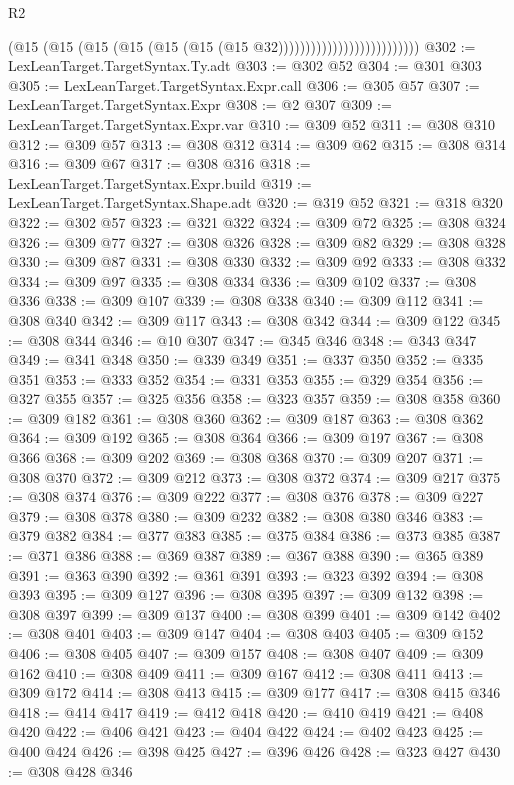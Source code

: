 \begin{lexlean}{R2}
\begin{coremodule}
                                          (@15
                                            (@15
                                              (@15 (@15 (@15 (@15 (@15 @32))))))))))))))))))))))))))
@302 := LexLeanTarget.TargetSyntax.Ty.adt
@303 := @302 @52
@304 := @301 @303
@305 := LexLeanTarget.TargetSyntax.Expr.call
@306 := @305 @57
@307 := LexLeanTarget.TargetSyntax.Expr
@308 := @2 @307
@309 := LexLeanTarget.TargetSyntax.Expr.var
@310 := @309 @52
@311 := @308 @310
@312 := @309 @57
@313 := @308 @312
@314 := @309 @62
@315 := @308 @314
@316 := @309 @67
@317 := @308 @316
@318 := LexLeanTarget.TargetSyntax.Expr.build
@319 := LexLeanTarget.TargetSyntax.Shape.adt
@320 := @319 @52
@321 := @318 @320
@322 := @302 @57
@323 := @321 @322
@324 := @309 @72
@325 := @308 @324
@326 := @309 @77
@327 := @308 @326
@328 := @309 @82
@329 := @308 @328
@330 := @309 @87
@331 := @308 @330
@332 := @309 @92
@333 := @308 @332
@334 := @309 @97
@335 := @308 @334
@336 := @309 @102
@337 := @308 @336
@338 := @309 @107
@339 := @308 @338
@340 := @309 @112
@341 := @308 @340
@342 := @309 @117
@343 := @308 @342
@344 := @309 @122
@345 := @308 @344
@346 := @10 @307
@347 := @345 @346
@348 := @343 @347
@349 := @341 @348
@350 := @339 @349
@351 := @337 @350
@352 := @335 @351
@353 := @333 @352
@354 := @331 @353
@355 := @329 @354
@356 := @327 @355
@357 := @325 @356
@358 := @323 @357
@359 := @308 @358
@360 := @309 @182
@361 := @308 @360
@362 := @309 @187
@363 := @308 @362
@364 := @309 @192
@365 := @308 @364
@366 := @309 @197
@367 := @308 @366
@368 := @309 @202
@369 := @308 @368
@370 := @309 @207
@371 := @308 @370
@372 := @309 @212
@373 := @308 @372
@374 := @309 @217
@375 := @308 @374
@376 := @309 @222
@377 := @308 @376
@378 := @309 @227
@379 := @308 @378
@380 := @309 @232
@382 := @308 @380 @346
@383 := @379 @382
@384 := @377 @383
@385 := @375 @384
@386 := @373 @385
@387 := @371 @386
@388 := @369 @387
@389 := @367 @388
@390 := @365 @389
@391 := @363 @390
@392 := @361 @391
@393 := @323 @392
@394 := @308 @393
@395 := @309 @127
@396 := @308 @395
@397 := @309 @132
@398 := @308 @397
@399 := @309 @137
@400 := @308 @399
@401 := @309 @142
@402 := @308 @401
@403 := @309 @147
@404 := @308 @403
@405 := @309 @152
@406 := @308 @405
@407 := @309 @157
@408 := @308 @407
@409 := @309 @162
@410 := @308 @409
@411 := @309 @167
@412 := @308 @411
@413 := @309 @172
@414 := @308 @413
@415 := @309 @177
@417 := @308 @415 @346
@418 := @414 @417
@419 := @412 @418
@420 := @410 @419
@421 := @408 @420
@422 := @406 @421
@423 := @404 @422
@424 := @402 @423
@425 := @400 @424
@426 := @398 @425
@427 := @396 @426
@428 := @323 @427
@430 := @308 @428 @346

\end{coremodule}
\end{lexlean}
